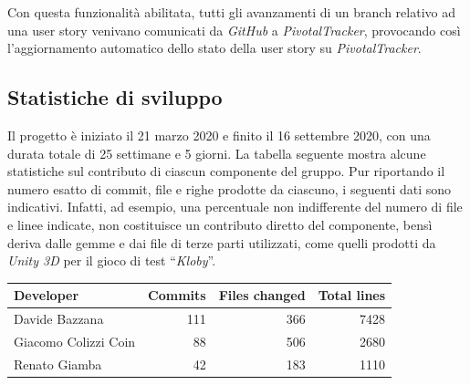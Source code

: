 Con questa funzionalità abilitata, tutti gli avanzamenti di un branch
relativo ad una user story venivano comunicati da \textit{GitHub} a
\textit{PivotalTracker}, provocando così l'aggiornamento automatico
dello stato della user story su \textit{PivotalTracker}.

\subsection{Statistiche di sviluppo}

Il progetto è iniziato il 21 marzo 2020 e finito il 16 settembre
2020, con una durata totale di 25 settimane e 5 giorni.
\newline
\newline
La tabella seguente mostra alcune statistiche sul contributo di
ciascun componente del gruppo. Pur riportando il numero esatto di
commit, file e righe prodotte da ciascuno, i seguenti dati sono
indicativi. Infatti, ad esempio, una percentuale non indifferente del
numero di file e linee indicate, non costituisce un contributo diretto
del componente, bensì deriva dalle gemme e dai file di terze parti
utilizzati, come quelli prodotti da \textit{Unity 3D} per il
gioco di test ``\textit{Kloby}''.

\vspace{1cm}
\begin{tabular}{l|r|r|r}
  \textbf{Developer} & \textbf{Commits} & \textbf{Files changed} & \textbf{Total lines} \\
  \hline
  Davide Bazzana & 111 & 366 & 7428 \\
  \hline
  Giacomo Colizzi Coin & 88 & 506 & 2680 \\
  \hline
  Renato Giamba & 42 & 183 & 1110 \\
  \hline
\end{tabular}
